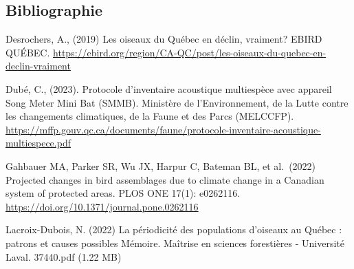 \documentclass[
]{article}
\begin{document}
\hypertarget{bibliographie}{%
\subsection{Bibliographie}\label{bibliographie}}

Desrochers, A., (2019) Les oiseaux du Québec en déclin, vraiment? EBIRD
QUÉBEC.
\url{https://ebird.org/region/CA-QC/post/les-oiseaux-du-quebec-en-declin-vraiment}

Dubé, C., (2023). Protocole d'inventaire acoustique multiespèce avec
appareil Song Meter Mini Bat (SMMB). Ministère de l'Environnement, de la
Lutte contre les changements climatiques, de la Faune et des Parcs
(MELCCFP).
\url{https://mffp.gouv.qc.ca/documents/faune/protocole-inventaire-acoustique-multiespece.pdf}

Gahbauer MA, Parker SR, Wu JX, Harpur C, Bateman BL, et al.~(2022)
Projected changes in bird assemblages due to climate change in a
Canadian system of protected areas. PLOS ONE 17(1): e0262116.
\url{https://doi.org/10.1371/journal.pone.0262116}

Lacroix-Dubois, N. (2022) La périodicité des populations d'oiseaux au
Québec : patrons et causes possibles Mémoire. Maîtrise en sciences
forestières - Université Laval. 37440.pdf (1.22 MB)
\end{document}
